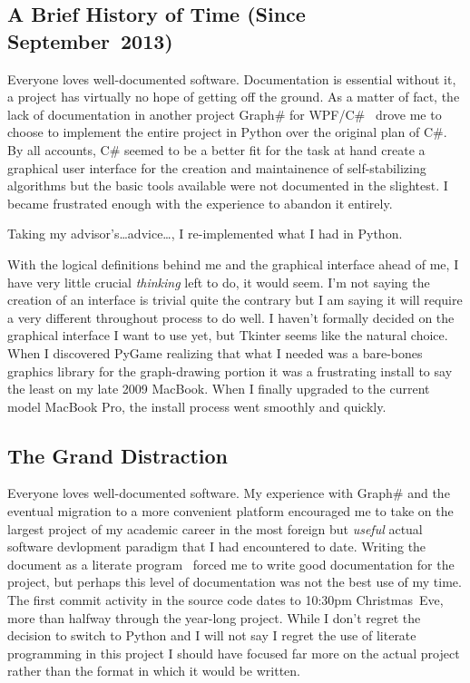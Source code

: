 \subsection{A Brief History of Time (Since September~2013)}
Everyone loves well-documented software.
Documentation is essential \Dash without it, a project has virtually no hope of getting off the ground.
As a matter of fact, the lack of documentation in another project \Dash
  Graph\# for WPF/C\#~\autocite{palesz:graphsharp} \Dash
  drove me to choose to implement the entire project in Python over the original plan of C\#.
By all accounts, C\# seemed to be a better fit for the task at hand \Dash
  create a graphical user interface for the creation and maintainence of self-stabilizing algorithms \Dash
  but the basic tools available were not documented in the slightest.
I became frustrated enough with the experience to abandon it entirely.

Taking my advisor's\dots advice\dots, I re-implemented what I had in Python.

\bigskip

With the logical definitions behind me and the graphical interface ahead of me,
  I have very little crucial \emph{thinking} left to do, it would seem.
I'm not saying the creation of an interface is trivial \Dash quite the contrary \Dash
  but I am saying it will require a very different throughout process to do well.
I haven't formally decided on the graphical interface I want to use yet, but Tkinter seems like the natural choice.
When I discovered PyGame \Dash realizing that what I needed was
  a bare-bones graphics library for the graph-drawing portion \Dash
  it was a frustrating install to say the least on my late 2009 MacBook.
When I finally upgraded to the current model MacBook Pro,
  the install process went smoothly and quickly.

\subsection{The Grand Distraction}
Everyone loves well-documented software.
My experience with Graph\# \Dash and the eventual migration to a more convenient platform \Dash
  encouraged me to take on the largest project of my academic career in
  the most foreign \Dash but \emph{useful} \Dash actual software devlopment paradigm
  that I had encountered to date.
Writing the document as a literate program~\autocite{knuth:lit-prog}
  forced me to write good documentation for the project,
  but perhaps this level of documentation was not the best use of my time.
The first commit activity in the source code dates to 10:30pm Christmas~Eve,
  more than halfway through the year-long project.
While I don't regret the decision to switch to Python \Dash
  and I will not say I regret the use of literate programming in this project \Dash
  I should have focused far more on the actual project
  rather than the format in which it would be written.

